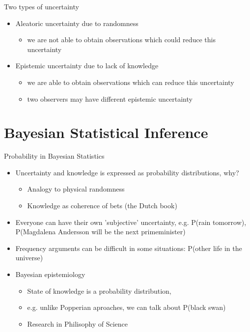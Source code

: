 \documentclass[10pt]{beamer}
\begin{document}
\begin{frame}{Two types of uncertainty}

  \begin{itemize}
  \item Aleatoric uncertainty due to randomness
    \begin{itemize}
    \item<2-> we are not able to obtain observations which could reduce
      this uncertainty
    \end{itemize}
    \vspace{\baselineskip}
  \item Epistemic uncertainty due to lack of knowledge
    \begin{itemize}
    \item<3-> we are able to obtain observations which can reduce
      this uncertainty
    \item<3-> two observers may have different epistemic uncertainty
    \end{itemize}
  \end{itemize}
\end{frame}


\section{Bayesian Statistical Inference}
\frame{\sectionpage}

\begin{frame}{Probability in Bayesian Statistics}

  \begin{itemize}
  \item Uncertainty and knowledge is expressed as probability distributions, why? \pause
  \begin{itemize}
    \item Analogy to physical randomness
    \item Knowledge as coherence of bets (the Dutch book)
  \end{itemize}
  \pause
  \item Everyone can have their own 'subjective' uncertainty, e.g.  P(rain tomorrow), P(Magdalena Andersson will be the next primeminister)
  \item Frequency arguments can be difficult in some situations: P(other life in the universe)
  \pause
  \item {\color{uured} Bayesian epistemiology}
  \begin{itemize}
  \item State of knowledge is a probability distribution,
  \item e.g. unlike Popperian aproaches, we can talk about P(black swan)
  \item Research in Philisophy of Science
  \end{itemize}
  \end{itemize}
\end{frame}
\end{document}
